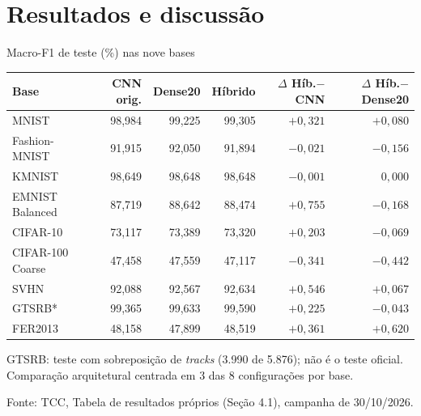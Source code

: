 \documentclass[aspectratio=169,11pt,brazil]{beamer}
\newcommand{\fonte}[1]{\par\vfill{\tiny\color{gray}Fonte: #1\par}}
\begin{document}
\section{Resultados e discussão}

\begin{frame}{Macro-F1 de teste (\%) nas nove bases}
  \centering
  \footnotesize
  \begin{tabular}{@{}lrrrrr@{}}
    \toprule
    \textbf{Base} & \textbf{CNN orig.} & \textbf{Dense20} & \textbf{Híbrido} & \textbf{$\Delta$ Híb.$-$CNN} & \textbf{$\Delta$ Híb.$-$Dense20} \\
    \midrule
    MNIST & 98,984 & 99,225 & 99,305 & $+0{,}321$ & $+0{,}080$ \\
    Fashion-MNIST & 91,915 & 92,050 & 91,894 & $-0{,}021$ & $-0{,}156$ \\
    KMNIST & 98,649 & 98,648 & 98,648 & $-0{,}001$ & $0{,}000$ \\
    EMNIST Balanced & 87,719 & 88,642 & 88,474 & $+0{,}755$ & $-0{,}168$ \\
    CIFAR-10 & 73,117 & 73,389 & 73,320 & $+0{,}203$ & $-0{,}069$ \\
    CIFAR-100 Coarse & 47,458 & 47,559 & 47,117 & $-0{,}341$ & $-0{,}442$ \\
    SVHN & 92,088 & 92,567 & 92,634 & $+0{,}546$ & $+0{,}067$ \\
    GTSRB* & 99,365 & 99,633 & 99,590 & $+0{,}225$ & $-0{,}043$ \\
    FER2013 & 48,158 & 47,899 & 48,519 & $+0{,}361$ & $+0{,}620$ \\
    \bottomrule
  \end{tabular}

  \vspace{0.15cm}
  \tiny *GTSRB: teste com sobreposição de \textit{tracks} (3.990 de 5.876); não é o teste oficial. Comparação arquitetural centrada em 3 das 8 configurações por base.
  \fonte{TCC, Tabela de resultados próprios (Seção 4.1), campanha de 30/10/2026.}
\end{frame}
\end{document}
